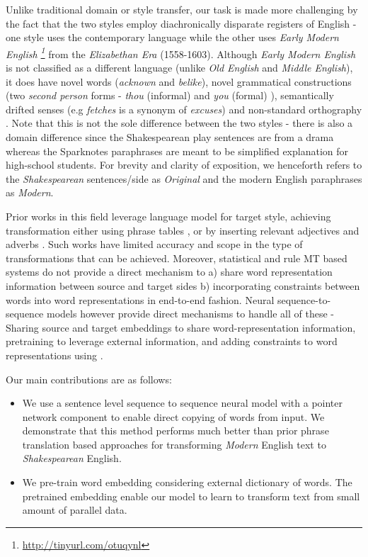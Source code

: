 Unlike traditional domain or style transfer, our task is made more challenging by the fact that the two styles employ diachronically disparate registers of English - one style uses the contemporary language while the other uses \textit{Early Modern English \footnote{\url{http://tinyurl.com/otuqynl}}} from the \textit{Elizabethan Era} (1558-1603). Although \textit{Early Modern English} is not classified as a different language (unlike \textit{Old English} and \textit{Middle English}), it does have novel words (\textit{acknown} and \textit{belike}), novel grammatical constructions (two \textit{second person} forms - \textit{thou} (informal) and \textit{you} (formal) \cite{brown1960pronouns}), semantically drifted senses (e.g \textit{fetches} is a synonym of \textit{excuses}) and non-standard orthography \cite{rayson2007tagging}. Note that this is not the sole difference between the two styles - there is also a domain difference since the Shakespearean play sentences are from a drama whereas the Sparknotes paraphrases are meant to be simplified explanation for high-school students. For brevity and clarity of exposition, we henceforth refers to the \textit{Shakespearean} sentences/side as \textit{Original} and the modern English paraphrases as \textit{Modern}.

Prior works in this field leverage language model for target style, achieving transformation either using phrase tables \cite{xu2012paraphrasing}, or by inserting relevant adjectives and adverbs \cite{saha2015automated}. Such works have limited accuracy and scope in the type of  transformations that can be achieved. Moreover, statistical and rule MT based systems do not provide a direct mechanism to a) share word representation information between source and target sides b) incorporating constraints between words into word representations in end-to-end fashion. Neural sequence-to-sequence models however provide direct mechanisms to handle all of these - Sharing source and target embeddings to share word-representation information, pretraining to leverage external information, and adding constraints to word representations using \cite{faruqui2014retrofitting}.


Our main contributions are as follows:
\begin{itemize}
    \item We use a sentence level sequence to sequence neural model with a pointer network component to enable direct copying of words from input. We demonstrate that this method performs much better than prior phrase translation based approaches for transforming \textit{Modern} English text to \emph{Shakespearean} English. 
    \item We pre-train word embedding considering external dictionary of words. The pretrained embedding enable our model to learn to transform text from small amount of parallel data. 
\end{itemize}

